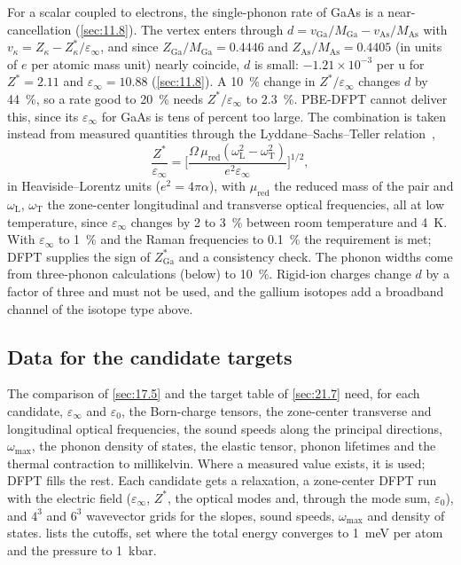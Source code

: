 For a scalar coupled to electrons, the single-phonon rate of GaAs is a near-cancellation (\cref{sec:11.8}). The vertex enters through $d = v_{\mathrm{Ga}}/M_{\mathrm{Ga}} - v_{\mathrm{As}}/M_{\mathrm{As}}$ with $v_\kappa = Z_\kappa - Z^*_\kappa/\varepsilon_\infty$, and since $Z_{\mathrm{Ga}}/M_{\mathrm{Ga}} = 0.4446$ and $Z_{\mathrm{As}}/M_{\mathrm{As}} = 0.4405$ (in units of $e$ per atomic mass unit) nearly coincide, $d$ is small: $-1.21\times10^{-3}$ per u for $Z^* = 2.11$ and $\varepsilon_\infty = 10.88$ (\cref{sec:11.8}). A \SI{10}{\percent} change in $Z^*/\varepsilon_\infty$ changes $d$ by \SI{44}{\percent}, so a rate good to \SI{20}{\percent} needs $Z^*/\varepsilon_\infty$ to \SI{2.3}{\percent}. PBE-DFPT cannot deliver this, since its $\varepsilon_\infty$ for GaAs is tens of percent too large. The combination is taken instead from measured quantities through the Lyddane--Sachs--Teller relation~\cite{lyddane1941polar},
\begin{equation}
  \frac{Z^*}{\varepsilon_\infty} = \Big[\frac{\Omega\,\mu_{\mathrm{red}}(\omega_{\mathrm{L}}^2 - \omega_{\mathrm{T}}^2)}{e^2\varepsilon_\infty}\Big]^{1/2} ,
  \label{eq:E.17-lst}
\end{equation}
in Heaviside--Lorentz units ($e^2 = 4\pi\alpha$), with $\mu_{\mathrm{red}}$ the reduced mass of the pair and $\omega_{\mathrm{L}}$, $\omega_{\mathrm{T}}$ the zone-center longitudinal and transverse optical frequencies, all at low temperature, since $\varepsilon_\infty$ changes by 2 to \SI{3}{\percent} between room temperature and \SI{4}{K}. With $\varepsilon_\infty$ to \SI{1}{\percent} and the Raman frequencies to \SI{0.1}{\percent} the requirement is met; DFPT supplies the sign of $Z^*_{\mathrm{Ga}}$ and a consistency check. The phonon widths come from three-phonon calculations (below) to \SI{10}{\percent}. Rigid-ion charges change $d$ by a factor of three and must not be used, and the gallium isotopes add a broadband channel of the isotope type above.

\subsection{Data for the candidate targets}

The comparison of \cref{sec:17.5} and the target table of \cref{sec:21.7} need, for each candidate, $\varepsilon_\infty$ and $\varepsilon_0$, the Born-charge tensors, the zone-center transverse and longitudinal optical frequencies, the sound speeds along the principal directions, $\omega_{\mathrm{max}}$, the phonon density of states, the elastic tensor, phonon lifetimes and the thermal contraction to millikelvin. Where a measured value exists, it is used; DFPT fills the rest. Each candidate gets a relaxation, a zone-center DFPT run with the electric field ($\varepsilon_\infty$, $Z^*$, the optical modes and, through the mode sum, $\varepsilon_0$), and $4^3$ and $6^3$ wavevector grids for the slopes, sound speeds, $\omega_{\mathrm{max}}$ and density of states.  lists the cutoffs, set where the total energy converges to \SI{1}{meV} per atom and the pressure to \SI{1}{kbar}.

